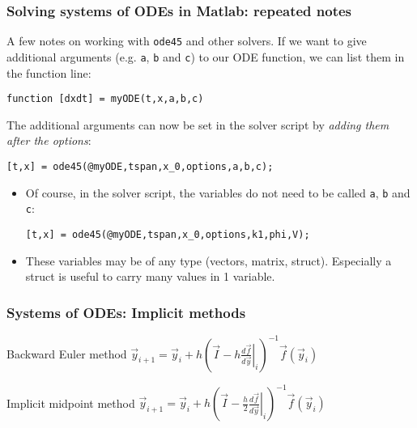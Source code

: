 \documentclass[11pt,table,final,fleqn,xcolor={usenames,dvipsnames,table}]{beamer}
\begin{document}
\begin{frame}[fragile]
  \frametitle{Solving systems of ODEs in Matlab: repeated notes}
  A few notes on working with \lstinline$ode45$ and other solvers. If we want to give additional arguments (e.g. \lstinline$a$, \lstinline$b$ and \lstinline$c$) to our ODE function, we can list them in the function line:
  \begin{lstlisting}
function [dxdt] = myODE(t,x,a,b,c)
  \end{lstlisting}
  The additional arguments can now be set in the solver script by \emph{adding them after the options}:
  \begin{lstlisting}
[t,x] = ode45(@myODE,tspan,x_0,options,a,b,c);
    \end{lstlisting}
  \pause
  \begin{itemize}
    \item Of course, in the solver script, the variables do not need to be called \lstinline$a$, \lstinline$b$ and \lstinline$c$:
      \begin{lstlisting}
[t,x] = ode45(@myODE,tspan,x_0,options,k1,phi,V);
    \end{lstlisting}
    \item These variables may be of any type (vectors, matrix, struct). Especially a struct is useful to carry many values in 1 variable.
  \end{itemize}
\end{frame}


\begin{frame}
  \frametitle{Systems of ODEs: Implicit methods}
  \begin{block}{Backward Euler method}
    $ \displaystyle  \vec{y}_{i+1} = \vec{y}_i + h \left(\vec{I} - h\left. \frac{d\vec{f}}{d\vec{y}}\right|_i \right)^{-1}\vec{f}(\vec{y}_i)$
  \end{block}
  \begin{block}{Implicit midpoint method}
    $ \displaystyle  \vec{y}_{i+1} = \vec{y}_i + h \left(\vec{I} - \frac{h}{2}\left. \frac{d\vec{f}}{d\vec{y}}\right|_i \right)^{-1} \vec{f}(\vec{y}_i)$
  \end{block}  
\end{frame}
\end{document}
